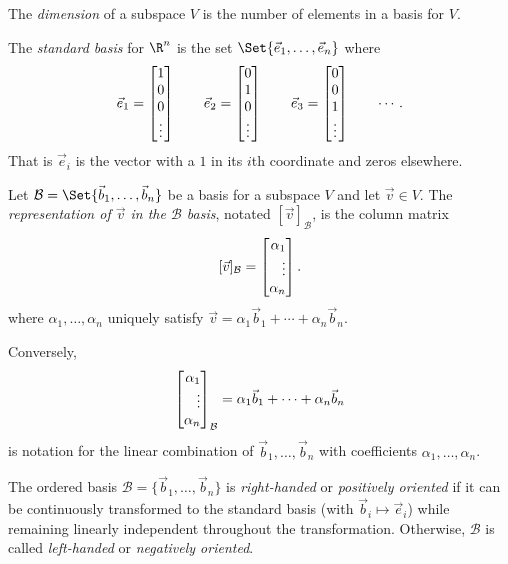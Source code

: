 \begin{SaveDefinition}[key=Dimension, title={Dimension}]
	The
	\emph{dimension} of a subspace $V$ is the number of elements in a basis
	for $V$.
\end{SaveDefinition}

\begin{SaveDefinition}[key=StandardBasisforRn, title={Standard Basis}]
	The \emph{standard basis} for $\R^n$ is the set $\Set{\vec e_1,\ldots,\vec e_n}$ where
	\[
		\vec e_1=\begin{bmatrix}1\\0\\0\\\vdots\end{bmatrix}\qquad
		\vec e_2=\begin{bmatrix}0\\1\\0\\\vdots\end{bmatrix}\qquad
		\vec e_3=\begin{bmatrix}0\\0\\1\\\vdots\end{bmatrix}\qquad\cdots.
	\]
	That is $\vec e_i$ is the vector with a $1$ in its
	$i$th coordinate and zeros elsewhere.
\end{SaveDefinition}

\begin{SaveDefinition}[
	key=RepresentationinaBasis,
	title={Representation in a Basis}]

	Let $\mathcal B=\Set{\vec b_1,\ldots,\vec b_n}$ be a basis for a
	subspace $V$ and let $\vec v\in V$. The
	\emph{representation of $\vec v$ in the $\mathcal B$ basis}, notated $[\vec
	v]_{\mathcal B}$, is the column matrix
	\[
		[\vec v]_{\mathcal B}= \mat{\alpha_1\\\vdots\\\alpha_n}.
	\]
	 where $\alpha_{1},\ldots,\alpha_{n}$ uniquely satisfy
	$\vec v=\alpha_{1}\vec b_{1}+\cdots+\alpha_{n}\vec b_{n}.$

	Conversely,
	\[
		\mat{\alpha_1\\\vdots\\\alpha_n}_{\mathcal B}= \alpha_{1}\vec b_{1}+\cdots
		+\alpha_{n}\vec b_{n}
	\]
	 is notation for the linear combination of $\vec b_{1},\ldots,\vec b_{n}$
	with coefficients $\alpha_{1},\ldots,\alpha_{n}$.
\end{SaveDefinition}

\begin{SaveDefinition}[key=OrientationofaBasis, title={Orientation of a Basis}]
	The ordered basis $\mathcal B=\{\vec b_{1},\ldots,\vec b_{n}\}$ is
	\emph{right-handed} or
	\emph{positively oriented} if it can be continuously transformed to the
	standard basis (with $\vec b_{i}\mapsto \vec e_{i}$) while remaining
	linearly independent throughout the transformation. Otherwise,
	$\mathcal B$ is called
	\emph{left-handed} or
	\emph{negatively oriented}.
\end{SaveDefinition}

